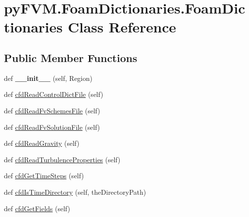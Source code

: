 \hypertarget{classpy_f_v_m_1_1_foam_dictionaries_1_1_foam_dictionaries}{}\section{py\+F\+V\+M.\+Foam\+Dictionaries.\+Foam\+Dictionaries Class Reference}
\label{classpy_f_v_m_1_1_foam_dictionaries_1_1_foam_dictionaries}
\subsection*{Public Member Functions}
\begin{DoxyCompactItemize}
\item 
\mbox{\label{classpy_f_v_m_1_1_foam_dictionaries_1_1_foam_dictionaries_acdace04bb94e27a0809a01f6adf59860}} 
def {\bfseries \+\_\+\+\_\+init\+\_\+\+\_\+} (self, Region)
\item 
def \mbox{\hyperlink{classpy_f_v_m_1_1_foam_dictionaries_1_1_foam_dictionaries_a5aa388360d6ae0e2f1fbbb5c40fafc84}{cfd\+Read\+Control\+Dict\+File}} (self)
\item 
def \mbox{\hyperlink{classpy_f_v_m_1_1_foam_dictionaries_1_1_foam_dictionaries_a586259cd3d8177fffb2657fcb0fbbdda}{cfd\+Read\+Fv\+Schemes\+File}} (self)
\item 
def \mbox{\hyperlink{classpy_f_v_m_1_1_foam_dictionaries_1_1_foam_dictionaries_a5b9c95cb974f3a14b4c882c127aa03b0}{cfd\+Read\+Fv\+Solution\+File}} (self)
\item 
def \mbox{\hyperlink{classpy_f_v_m_1_1_foam_dictionaries_1_1_foam_dictionaries_af0d447ad82604e14735ed55b2662fb57}{cfd\+Read\+Gravity}} (self)
\item 
def \mbox{\hyperlink{classpy_f_v_m_1_1_foam_dictionaries_1_1_foam_dictionaries_a1780db01d9935185bd2922dece68b409}{cfd\+Read\+Turbulence\+Properties}} (self)
\item 
def \mbox{\hyperlink{classpy_f_v_m_1_1_foam_dictionaries_1_1_foam_dictionaries_abf1810532990f184f1cb6baa64e1c890}{cfd\+Get\+Time\+Steps}} (self)
\item 
def \mbox{\hyperlink{classpy_f_v_m_1_1_foam_dictionaries_1_1_foam_dictionaries_a6eda998c08965775c1a5c7e4b9d2dd43}{cfd\+Is\+Time\+Directory}} (self, the\+Directory\+Path)
\item 
def \mbox{\hyperlink{classpy_f_v_m_1_1_foam_dictionaries_1_1_foam_dictionaries_acd0e5c0be262249022d98cfd7be21de6}{cfd\+Get\+Fields}} (self)

\end{DoxyCompactItemize}
